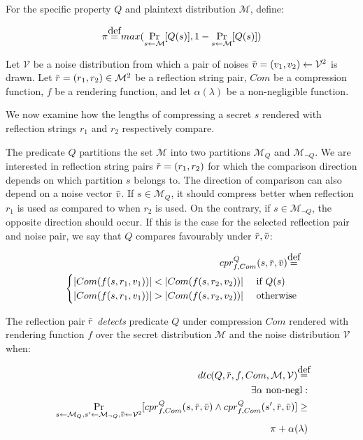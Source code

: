 \documentclass{sig-alternate-05-2015}
\newcommand\defeq{\stackrel{\mathclap{\normalfont\mbox{def}}}{=}}
\newcommand{\overbar}[1]{\mkern 1.5mu\overline{\mkern-1.5mu#1\mkern-1.5mu}\mkern 1.5mu}
\begin{document}
For the specific property $Q$ and plaintext distribution $\mathcal{M}$, define:

\begin{equation*}
    \pi \defeq max(\Pr_{s \leftarrow \mathcal{M}}[Q(s)], 1 - \Pr_{s \leftarrow \mathcal{M}}[Q(s)])
\end{equation*}

Let $\mathcal{V}$ be a noise distribution from which a pair of noises
$\overbar{v} = (v_1, v_2) \leftarrow \mathcal{V}^2$ is drawn.  Let $\overbar{r}
= (r_1, r_2) \in \mathcal{M}^2$ be a reflection string pair, $Com$ be a
compression function, $f$ be a rendering function, and let $\alpha(\lambda)$ be
a non-negligible function.

We now examine how the lengths of compressing a secret $s$ rendered with
reflection strings $r_1$ and $r_2$ respectively compare.

The predicate $Q$ partitions the set $\mathcal{M}$ into two partitions
$\mathcal{M}_Q$ and $\mathcal{M}_{\lnot Q}$. We are interested in reflection
string pairs $\overbar{r} = (r_1, r_2)$ for which the comparison direction
depends on which partition $s$ belongs to.  The direction of comparison can
also depend on a noise vector $\overbar{v}$.  If $s \in \mathcal{M}_Q$, it
should compress better when reflection $r_1$ is used as compared to when $r_2$
is used. On the contrary, if $s \in \mathcal{M}_{\lnot Q}$, the opposite
direction should occur.  If this is the case for the selected reflection pair
and noise pair, we say that $Q$ compares favourably under $\overbar{r},
\overbar{v}$:

\begin{equation*}
\begin{split}
    cpr^Q_{f, Com}(s, \overbar{r}, \overbar{v})
    \defeq\\
    \begin{cases}
        |Com(f(s, r_1, v_1))| < |Com(f(s, r_2, v_2))| &\text{ if } Q(s)\\
        |Com(f(s, r_1, v_1))| > |Com(f(s, r_2, v_2))| &\text{ otherwise}
    \end{cases}
\end{split}
\end{equation*}

The reflection pair $\overbar{r}$ \textit{detects} predicate $Q$ under
compression $Com$ rendered with rendering function $f$ over the secret
distribution $\mathcal{M}$ and the noise distribution $\mathcal{V}$ when:

\begin{align*}
    dtc(Q, \overbar{r}, f, Com, \mathcal{M}, \mathcal{V})
    \defeq\\
    \exists \alpha \text{ non-negl}:\\
    \Pr_{s \leftarrow \mathcal{M}_Q,
        s' \leftarrow \mathcal{M}_{\lnot Q},
        \overbar{v} \leftarrow \mathcal{V}^2}
        [cpr^Q_{f, Com}(s, \overbar{r}, \overbar{v}) \land
         cpr^Q_{f, Com}(s', \overbar{r}, \overbar{v})]
    \geq\\
    \pi + \alpha(\lambda)
\end{align*}
\end{document}
